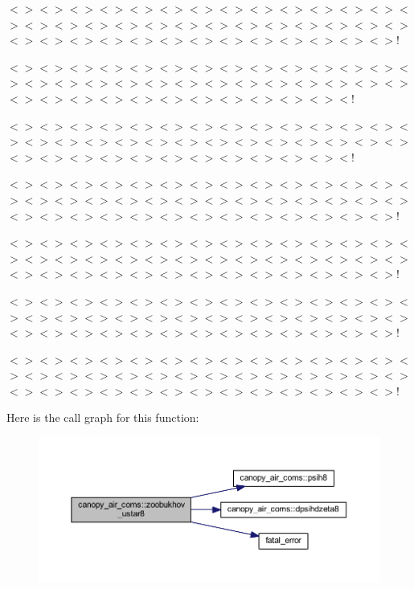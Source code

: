 $<$$>$$<$$>$$<$$>$$<$$>$$<$$>$$<$$>$$<$$>$$<$$>$$<$$>$$<$$>$$<$$>$$<$$>$$<$$>$$<$$>$$<$$>$$<$$>$$<$$>$$<$$>$$<$$>$$<$$>$$<$$>$$<$$>$$<$$>$$<$$>$$<$$>$$<$$>$$<$$>$$<$$>$$<$$>$$<$$>$$<$$>$$<$$>$$<$$>$$<$$>$$<$$>$$<$$>$$<$$>$$<$$>$$<$$>$$<$$>$!

$<$$>$$<$$>$$<$$>$$<$$>$$<$$>$$<$$>$$<$$>$$<$$>$$<$$>$$<$$>$$<$$>$$<$$>$$<$$>$$<$$>$$<$$>$$<$$>$$<$$>$$<$$>$$<$$>$$<$$>$$<$$>$$<$$>$$<$$>$$<$$>$$<$$>$$<$$>$$<$$>$$<$$>$$<$$>$$<$$>$$<$$>$$<$$>$$<$$>$$<$$>$$<$$>$$<$$>$$<$$>$$<$$>$$<$!

$<$$>$$<$$>$$<$$>$$<$$>$$<$$>$$<$$>$$<$$>$$<$$>$$<$$>$$<$$>$$<$$>$$<$$>$$<$$>$$<$$>$$<$$>$$<$$>$$<$$>$$<$$>$$<$$>$$<$$>$$<$$>$$<$$>$$<$$>$$<$$>$$<$$>$$<$$>$$<$$>$$<$$>$$<$$>$$<$$>$$<$$>$$<$$>$$<$$>$$<$$>$$<$$>$$<$$>$$<$$>$$<$$>$$<$!

$<$$>$$<$$>$$<$$>$$<$$>$$<$$>$$<$$>$$<$$>$$<$$>$$<$$>$$<$$>$$<$$>$$<$$>$$<$$>$$<$$>$$<$$>$$<$$>$$<$$>$$<$$>$$<$$>$$<$$>$$<$$>$$<$$>$$<$$>$$<$$>$$<$$>$$<$$>$$<$$>$$<$$>$$<$$>$$<$$>$$<$$>$$<$$>$$<$$>$$<$$>$$<$$>$$<$$>$$<$$>$$<$$>$$<$$>$$<$$>$!

$<$$>$$<$$>$$<$$>$$<$$>$$<$$>$$<$$>$$<$$>$$<$$>$$<$$>$$<$$>$$<$$>$$<$$>$$<$$>$$<$$>$$<$$>$$<$$>$$<$$>$$<$$>$$<$$>$$<$$>$$<$$>$$<$$>$$<$$>$$<$$>$$<$$>$$<$$>$$<$$>$$<$$>$$<$$>$$<$$>$$<$$>$$<$$>$$<$$>$$<$$>$$<$$>$$<$$>$$<$$>$$<$$>$$<$$>$$<$$>$!

$<$$>$$<$$>$$<$$>$$<$$>$$<$$>$$<$$>$$<$$>$$<$$>$$<$$>$$<$$>$$<$$>$$<$$>$$<$$>$$<$$>$$<$$>$$<$$>$$<$$>$$<$$>$$<$$>$$<$$>$$<$$>$$<$$>$$<$$>$$<$$>$$<$$>$$<$$>$$<$$>$$<$$>$$<$$>$$<$$>$$<$$>$$<$$>$$<$$>$$<$$>$$<$$>$$<$$>$$<$$>$$<$$>$$<$$>$$<$$>$!

$<$$>$$<$$>$$<$$>$$<$$>$$<$$>$$<$$>$$<$$>$$<$$>$$<$$>$$<$$>$$<$$>$$<$$>$$<$$>$$<$$>$$<$$>$$<$$>$$<$$>$$<$$>$$<$$>$$<$$>$$<$$>$$<$$>$$<$$>$$<$$>$$<$$>$$<$$>$$<$$>$$<$$>$$<$$>$$<$$>$$<$$>$$<$$>$$<$$>$$<$$>$$<$$>$$<$$>$$<$$>$$<$$>$$<$$>$$<$$>$! 

Here is the call graph for this function\+:\nopagebreak
\begin{figure}[H]
\begin{center}
\leavevmode
\includegraphics[width=350pt]{namespacecanopy__air__coms_a6ef582f46fded1355973730e6a2289f2_cgraph}
\end{center}
\end{figure}




